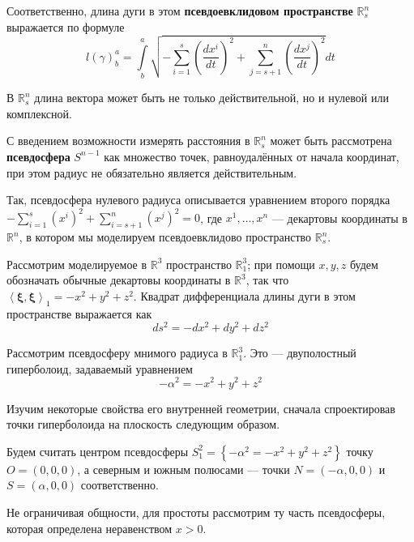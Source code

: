 \documentclass{article}
\numberwithin{equation}{section}
\newcommand{\neword}[1]{\textbf{#1}}
\newcommand{\scalmult}[2]{{\left \langle #1 \right \rangle}_{#2}}
\renewcommand{\vec}{\mathbf}
\begin{document}
Соответственно, длина дуги в этом \neword{псевдоевклидовом
  пространстве} $\mathbb{R}^n_s$ выражается по формуле
\begin{equation*}
  l(\gamma)^a_b = \int \limits^a_b {\sqrt{-\sum_{i=1}^s{\left
          (\frac{dx^i}{dt} \right )}^2 + \sum_{j=s+1}^n{\left
          (\frac{dx^j}{dt} \right )}^2}dt}
\end{equation*}

В $\mathbb{R}^n_s$ длина вектора может быть не только действительной,
но и нулевой или комплексной.

С введением возможности измерять расстояния в $\mathbb{R}^n_s$ может
быть рассмотрена \neword{псевдосфера} $S^{n-1}$ как множество точек,
равноудалённых от начала координат, при этом радиус не обязательно
является действительным.

Так, псевдосфера нулевого радиуса описывается уравнением второго порядка
$-\sum_{i=1}^s\left (x^i \right)^2 + \sum_{i=s+1}^n\left(x^j \right)^2 = 0$, где
$x^1, \dotsc, x^n $ — декартовы координаты в $\mathbb{R}^n$, в котором
мы моделируем псевдоевклидово пространство $\mathbb{R}^n_s$.

Рассмотрим моделируемое в $\mathbb{R}^3$ пространство
$\mathbb{R}^3_1$; при помощи $x, y, z$ будем обозначать обычные
декартовы координаты в $\mathbb{R}^3$, так что
$\scalmult{\vec{\xi}, \vec{\xi}}{1} = -x^2 + y^2 + z^2$. Квадрат
дифференциала длины дуги в этом пространстве выражается как
\begin{equation}\label{eq:R^3_1-linear-element}
  ds^2 = -dx^2 + dy^2 + dz^2
\end{equation}

Рассмотрим псевдосферу мнимого радиуса в $\mathbb{R}^3_1$. Это —
двуполостный гиперболоид, задаваемый уравнением
\begin{equation}\label{eq:pseudosphere}
  -\alpha^2 = -x^2 +y^2 + z^2
\end{equation}

Изучим некоторые свойства его внутренней геометрии,
сначала спроектировав точки гиперболоида на плоскость следующим
образом.

Будем считать центром псевдосферы $S^2_1=\left \{-\alpha^2 = -x^2 + y^2 +
  z^2\right \}$ точку $O=(0, 0, 0)$, а северным и южным полюсами — точки
$N=(-\alpha, 0, 0)$ и $S=(\alpha, 0, 0)$ соответственно.



Не ограничивая общности, для простоты рассмотрим ту часть псевдосферы,
которая определена неравенством $x>0$.
\end{document}
